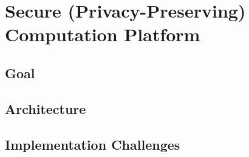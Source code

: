 
\chapter{Secure (Privacy-Preserving) Computation Platform}
\label{ch:proposal}

\section{Goal}

\section{Architecture}

\section{Implementation Challenges}
